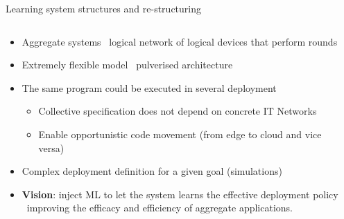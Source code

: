 \documentclass[8pt, aspectratio=169, handout]{beamer}
\begin{document}
\begin{frame}[allowframebreaks]{Learning system structures and re-structuring}
  \begin{columns}
    \begin{column}[c]{0.65\textwidth}
      \begin{cardTiny}
      \begin{itemize}
        \item Aggregate systems \faArrowRight \, logical network  of logical devices that perform rounds
        \item Extremely flexible model \faArrowRight \, pulverised architecture~\cite{casadei2020pulverization}
        \item The same program could be executed in several deployment
        \begin{itemize}
          \item Collective specification does not depend on concrete IT Networks
          \item Enable opportunistic code movement (from edge to cloud and vice versa)
        \end{itemize}
        \item[\failure{\faThumbsDown}] Complex deployment definition for a given goal (simulations)
        \item[\success{\faThumbsUp}] \textbf{Vision}: inject ML to let the system learns the effective deployment policy \faArrowRight \,  improving the efficacy and
        efficiency of aggregate applications.
      \end{itemize}
    \end{cardTiny}
  \end{column}
  \begin{column}[c]{0.3\textwidth}
  \end{column}
  \end{columns}
\end{frame}
\end{document}
